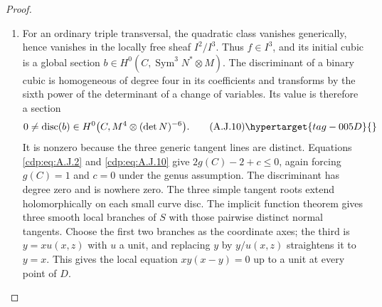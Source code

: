 \begin{proof}
\begin{enumerate}[label=\arabic*.,leftmargin=*]
\item For an ordinary triple transversal, the quadratic class
vanishes generically, hence vanishes in the locally free
sheaf $I^2/I^3$. Thus $f\in I^3$, and its initial cubic
is a global section
$b\in H^0(C,\operatorname{Sym}^3N^*\otimes M)$.
The discriminant of a binary cubic is homogeneous of degree
four in its coefficients and transforms by the sixth power
of the determinant of a change of variables. Its value is
therefore a section
\[
 0\ne\operatorname{disc}(b)\in
 H^0\bigl(C,M^4\otimes(\det N)^{-6}\bigr).
                                                        \tag{A.J.10}\hypertarget{tag-005D}{}\label{cdp:eq:A.J.10}
\]
It is nonzero because the three generic tangent lines are
distinct. Equations \eqref{cdp:eq:A.J.2} and \eqref{cdp:eq:A.J.10} give
$2g(C)-2+c\leq0$, again forcing $g(C)=1$ and $c=0$
under the genus assumption. The discriminant has degree
zero and is nowhere zero. The three simple tangent roots
extend holomorphically on each small curve disc. The implicit
function theorem gives three smooth local branches of $S$
with those pairwise distinct normal tangents. Choose the
first two branches as the coordinate axes; the third is
$y=xu(x,z)$ with $u$ a unit, and replacing $y$ by $y/u(x,z)$
straightens it to $y=x$. This gives the local equation
$xy(x-y)=0$ up to a unit at every point of $D$.

\end{enumerate}
\end{proof}
